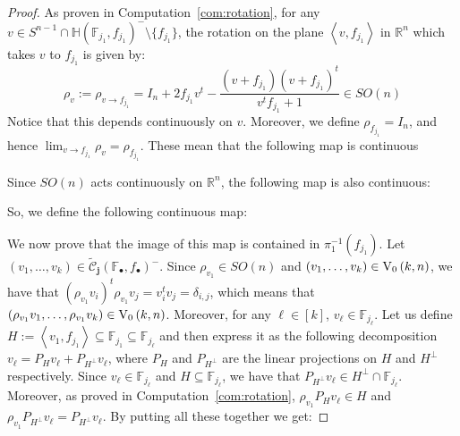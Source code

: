 \begin{proof}
As proven in Computation~\ref{com:rotation}, for any $v\in S^{n-1}\cap\mathbb{H}{\left(\mathbb{F}_{j_1},f_{j_1}\right)}^-\setminus\{f_{j_1}\}$, the rotation on the plane $\left<v,f_{j_1}\right>$ in $\mathbb{R}^n$ which takes $v$ to $f_{j_1}$ is given by:
\[\rho_v:=\rho_{v\to f_{j_1}}=I_n+2f_{j_1}v^t-\frac{(v+f_{j_1})(v+f_{j_1})^t}{v^tf_{j_1}+1}\in SO(n)\]
Notice that this depends continuously on $v$. Moreover, we define $\rho_{f_{j_1}}=I_n$, and hence $\lim_{v\to f_{j_1}}\rho_v=\rho_{f_{j_1}}$. These mean that the following map is continuous
\begin{center}
\end{center}
Since $SO(n)$ acts continuously on $\mathbb{R}^n$, the following map is also continuous:
\begin{center}
\end{center}
So, we define the following continuous map:
\begin{center}
\end{center}
We now prove that the image of this map is contained in $\pi_1^{-1}(f_{j_1})$. Let $(v_1,\ldots,v_k)\in\tilde{\mathcal{C}}_{\mathbf{j}}{\left(\mathbb{F}_{\bullet},f_{\bullet}\right)}^-$. Since $\rho_{v_1}\in SO(n)$ and $(v_1,\ldots,v_k)\in\StO{k}{n}$, we have that $(\rho_{v_1}v_i)^t\rho_{v_1}v_j=v_i^tv_j=\delta_{i,j}$, which means that $(\rho_{v_1}v_1,\ldots,\rho_{v_1}v_k)\in\StO{k}{n}$. Moreover, for any $\ell\in[k]$, $v_{\ell}\in\mathbb{F}_{j_{\ell}}$. Let us define $H:=\left<v_1,f_{j_1}\right>\subseteq\mathbb{F}_{j_1}\subseteq\mathbb{F}_{j_{\ell}}$ and then express it as the following decomposition $v_{\ell}=P_Hv_{\ell}+P_{H^{\perp}}v_{\ell}$, where $P_H$ and $P_{H^{\perp}}$ are the linear projections on $H$ and $H^{\perp}$ respectively. Since $v_{\ell}\in\mathbb{F}_{j_{\ell}}$ and $H\subseteq\mathbb{F}_{j_{\ell}}$, we have that $P_{H^{\perp}}v_{\ell}\in H^{\perp}\cap\mathbb{F}_{j_{\ell}}$. Moreover, as proved in Computation~\ref{com:rotation}, $\rho_{v_1}P_Hv_{\ell}\in H$ and $\rho_{v_1}P_{H^{\perp}}v_{\ell}=P_{H^{\perp}}v_{\ell}$. By putting all these together we get:

\end{proof}
